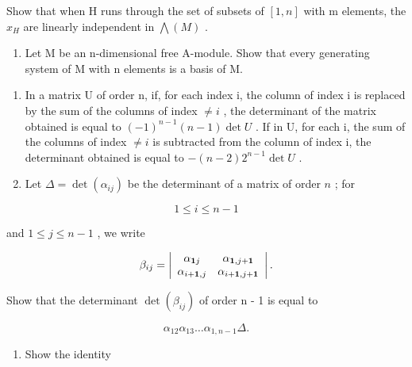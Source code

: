Show that when H runs through the set of subsets of \([1, n]\) with m elements, the \(x_{H}\) are linearly independent in \(\bigwedge(M)\) .

\begin{enumerate}
\def\labelenumi{\arabic{enumi}.}
\setcounter{enumi}{14}
\tightlist
\item
  Let M be an n-dimensional free A-module. Show that every generating system of M with n elements is a basis of M.
\end{enumerate}

\BourbakiExercisesSection

\begin{enumerate}
\def\labelenumi{\arabic{enumi}.}
\item
  In a matrix U of order n, if, for each index i, the column of index i is replaced by the sum of the columns of index \(\neq i\) , the determinant of the matrix obtained is equal to \((-1)^{n-1}(n-1)\det U\) . If in U, for each i, the sum of the columns of index \(\neq i\) is subtracted from the column of index i, the determinant obtained is equal to \(-(n-2)2^{n-1}\det U\) .
\item
  Let \(\Delta = \det (\alpha_{ij})\) be the determinant of a matrix of order \(n\) ; for
\end{enumerate}

\[
1 \leqslant i \leqslant n - 1
\]

and \(1 \leqslant j \leqslant n - 1\) , we write

\[
\beta_ {i j} = \left| \begin{array}{c c} \alpha_ {\mathbf {1} j} & \alpha_ {\mathbf {1}, j + \mathbf {1}} \\ \alpha_ {i + \mathbf {1}, j} & \alpha_ {i + \mathbf {1}, j + \mathbf {1}} \end{array} \right|.
\]

Show that the determinant \(\det(\beta_{ij})\) of order n - 1 is equal to

\[
\alpha_ {1 2} \alpha_ {1 3} \dots \alpha_ {1, n - 1} \Delta .
\]

\begin{enumerate}
\def\labelenumi{\arabic{enumi}.}
\setcounter{enumi}{2}
\tightlist
\item
  Show the identity
\end{enumerate}

